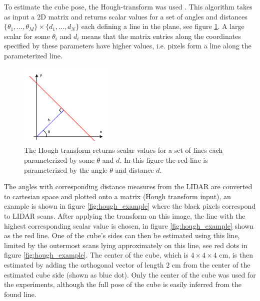 To estimate the cube pose, the Hough-transform was used \cite{duda1972use}.
This algorithm takes as input a 2D matrix and returns scalar values for a set
of angles and distances $\lbrace \theta_1, ..., \theta_M\rbrace \times \lbrace
d_1, ..., d_N \rbrace$ each defining a line in the plane, see figure
\ref{fig:hough}. A large scalar for some $\theta_i$ and $d_i$ means that the
matrix entries along the coordinates specified by these parameters have higher
values, i.e. pixels form a line along the parameterized line.

\begin{figure}[h]
    \centering
    \includegraphics[width=0.40\textwidth]{res/hough.pdf}

    \caption{The Hough transform returns scalar values for a set of lines each
    parameterized by some $\theta$ and $d$. In this figure the red line is
    parameterized by the angle $\theta$ and distance $d$.}

    \label{fig:hough}
\end{figure}

The angles with corresponding distance measures from the LIDAR are converted to
cartesian space and plotted onto a matrix (Hough transform input), an example
is shown in figure \ref{fig:hough_example} where the black pixels correspond to
LIDAR scans. After applying the transform on this image, the line with the
highest corresponding scalar value is chosen, in figure \ref{fig:hough_example}
shown as the red line. One of the cube's sides can then be estimated using this
line, limited by the outermost scans lying approximately on this line, see red
dots in figure \ref{fig:hough_example}. The center of the cube, which is
$4\times 4\times 4$ cm, is then estimated by adding the orthogonal vector of
length $2$ cm from the center of the estimated cube side (shown as blue dot).
Only the center of the cube was used for the experiments, although the full
pose of the cube is easily inferred from the found line.

